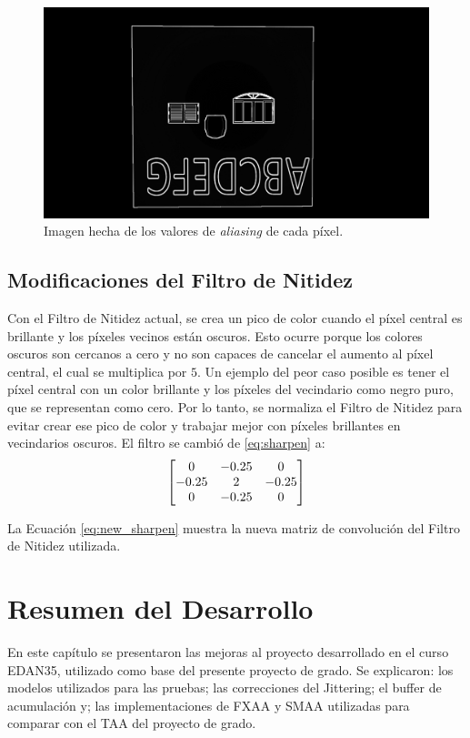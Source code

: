 \documentclass[pregrado]{tesis-usb} %
\begin{document}
\begin{figure}[H]
	\centering
	\includegraphics[scale=0.2]{images/aliased_value_example_3_temporal.png}
	\caption{Imagen hecha de los valores de \textit{aliasing} de cada píxel.}\label{fig:aliasedval3}
\end{figure}

\subsection{Modificaciones del Filtro de Nitidez}
Con el Filtro de Nitidez actual, se crea un pico de color cuando el píxel central es brillante y los píxeles vecinos están oscuros. Esto ocurre porque los colores oscuros son cercanos a cero y no son capaces de cancelar el aumento al píxel central, el cual se multiplica por $5$. Un ejemplo del peor caso posible es tener el píxel central con un color brillante y los píxeles del vecindario como negro puro, que se representan como cero. Por lo tanto, se normaliza el Filtro de Nitidez para evitar crear ese pico de color y trabajar mejor con píxeles brillantes en vecindarios oscuros. El filtro se cambió de \ref{eq:sharpen} a:
\begin{equation} \label{eq:new_sharpen}
\centering
\begin{bmatrix*}[c]
0 & -0.25 &  0 \\
-0.25  &  2 & -0.25  \\
0 & -0.25  &  0
\end{bmatrix*}
\end{equation}

La Ecuación \ref{eq:new_sharpen} muestra la nueva matriz de convolución del Filtro de Nitidez utilizada.

\section{Resumen del Desarrollo}
En este capítulo se presentaron las mejoras al proyecto desarrollado en el curso EDAN35, utilizado como base del presente proyecto de grado. Se explicaron: los modelos utilizados para las pruebas; las correcciones del Jittering; el buffer de acumulación y; las implementaciones de FXAA y SMAA utilizadas para comparar con el TAA del proyecto de grado.  
\end{document}
